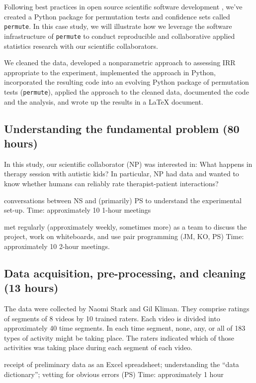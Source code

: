 \documentclass[]{article}
\begin{document}
Following best practices in open source scientific software development
\cite{millman2014developing}, we've created a Python package for permutation
tests and confidence sets called \texttt{permute}.
In this case study, we will illustrate how we leverage the software
infrastructure of \texttt{permute} to conduct reproducible and collaborative
applied statistics research with our scientific collaborators.

We cleaned the data, developed a nonparametric approach to assessing IRR
appropriate to the experiment, implemented the approach in Python,
incorporated the resulting code into an evolving Python package of
permutation tests (\texttt{permute}), applied the approach to the cleaned
data, documented the code and the analysis, and wrote up the results in
a LaTeX document. 

\subsection{Understanding the fundamental problem (80 hours)}

In this study, our scientific collaborator (NP) was interested
in:  What happens in therapy session with autistic kids?
In particular, NP had data and wanted to know whether humans can reliably
rate therapist-patient interactions?

conversations between NS and (primarily) PS to
understand the experimental set-up. Time: approximately 10 1-hour
meetings
    
met regularly (approximately weekly, sometimes more) as a team to
discuss the project, work on whiteboards, and use pair programming
(JM, KO, PS) Time: approximately 10 2-hour
meetings.
  

\subsection{Data acquisition, pre-processing, and cleaning (13 hours)}

The data were collected by Naomi Stark and Gil Kliman. They
comprise ratings of segments of 8 videos by 10 trained raters. Each
video is divided into approximately 40 time segments. In each time
segment, none, any, or all of 183 types of activity might be taking
place. The raters indicated which of those activities was taking place
during each segment of each video.


receipt of preliminary data as an Excel spreadsheet; understanding
the ``data dictionary''; vetting for obvious errors (PS) Time:
approximately 1 hour
\end{document}
